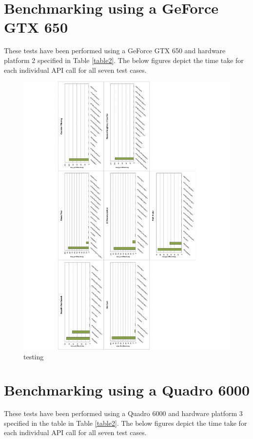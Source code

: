 \documentclass[paper=a4, fontsize=11pt]{scrartcl}
\numberwithin{equation}{section}		%
\numberwithin{figure}{section}			%
\numberwithin{table}{section}				%
\begin{document}
\newpage
\section{Benchmarking using a GeForce GTX 650}
These tests have been performed using a GeForce GTX 650 and hardware platform 2 specified in Table \ref{table2}. The below figures depict the time take for each individual API call for all seven test cases.

\begin{figure}[!h]
\centering
\includegraphics[scale=0.6]{../imgs/x650.pdf}
\caption{testing}
\label{??}
\end{figure}




\newpage
\section{Benchmarking using a Quadro 6000}
These tests have been performed using a Quadro 6000 and hardware platform 3 specified in the table in Table \ref{table2}. The below figures depict the time take for each individual API call for all seven test cases.
\end{document}
